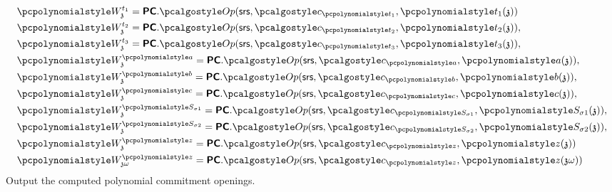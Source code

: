 \documentclass[runningheads,11pt]{llncs}
\begin{document}
\begin{description}
  \begin{align*}
    & \p{W_\chz^{t_1}} = \PCOM.\open(\srs, \cp{t_{1}}, \p{t_1}(\chz)) \\
    & \p{W_\chz^{t_2}} = \PCOM.\open(\srs, \cp{t_{2}}, \p{t_2}(\chz)), \\
    & \p{W_\chz^{t_3}} = \PCOM.\open(\srs, \cp{t_{3}}, \p{t_3}(\chz)), \\
    & \p{W_\chz^{\p{a}}} = \PCOM.\open(\srs, \cp{a}, \p{a}(\chz)), \\
    & \p{W_\chz^{\p{b}}} = \PCOM.\open(\srs, \cp{b}, \p{b}(\chz)), \\
    & \p{W_\chz^{\p{c}}} = \PCOM.\open(\srs, \cp{c}, \p{c}(\chz)), \\
    & \p{W_\chz^{\p{S_{\sigma 1}}}} = \PCOM.\open(\srs, \cp{S_{\sigma 1}}, \p{S_{\sigma 1}}(\chz)), \\
    & \p{W_\chz^{\p{S_{\sigma 2}}}} = \PCOM.\open(\srs, \cp{S_{\sigma 2}}, 
      \p{S_{\sigma 2}}(\chz)), \\
    & \p{W_{\chz}^{\p{z}}} = \PCOM.\open(\srs, \cp{z}, \p{z}(\chz)) \\
    & \p{W_{\chz \omega}^{\p{z}}} = \PCOM.\open(\srs, \cp{z}, \p{z}(\chz \omega))
 \end{align*}
 Output the computed polynomial commitment openings.
\end{description}
\end{document}
